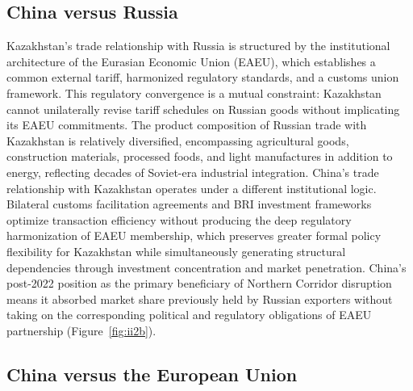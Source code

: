 \documentclass[12pt]{article}
\begin{document}
\subsection{China versus Russia}

Kazakhstan's trade relationship with Russia is structured by the institutional architecture of the Eurasian Economic Union (EAEU), which establishes a common external tariff, harmonized regulatory standards, and a customs union framework. This regulatory convergence is a mutual constraint: Kazakhstan cannot unilaterally revise tariff schedules on Russian goods without implicating its EAEU commitments. The product composition of Russian trade with Kazakhstan is relatively diversified, encompassing agricultural goods, construction materials, processed foods, and light manufactures in addition to energy, reflecting decades of Soviet-era industrial integration. China's trade relationship with Kazakhstan operates under a different institutional logic. Bilateral customs facilitation agreements and BRI investment frameworks optimize transaction efficiency without producing the deep regulatory harmonization of EAEU membership, which preserves greater formal policy flexibility for Kazakhstan while simultaneously generating structural dependencies through investment concentration and market penetration. China's post-2022 position as the primary beneficiary of Northern Corridor disruption means it absorbed market share previously held by Russian exporters without taking on the corresponding political and regulatory obligations of EAEU partnership (Figure~\ref{fig:ii2b}).

\subsection{China versus the European Union}
\end{document}
